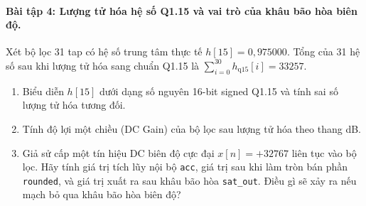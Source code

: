 \paragraph{Bài tập 4: Lượng tử hóa hệ số Q1.15 và vai trò của khâu bão hòa biên độ.}
Xét bộ lọc 31 tap có hệ số trung tâm thực tế $h[15] = 0{,}975000$. Tổng của 31 hệ số sau khi lượng tử hóa sang chuẩn Q1.15 là $\sum_{i=0}^{30} h_{\text{q15}}[i] = 33257$.
\begin{enumerate}[label=(\alph*)]
    \item Biểu diễn $h[15]$ dưới dạng số nguyên 16-bit signed Q1.15 và tính sai số lượng tử hóa tương đối.
    \item Tính độ lợi một chiều (DC Gain) của bộ lọc sau lượng tử hóa theo thang dB.
    \item Giả sử cấp một tín hiệu DC biên độ cực đại $x[n] = +32767$ liên tục vào bộ lọc. Hãy tính giá trị tích lũy nội bộ \texttt{acc}, giá trị sau khi làm tròn bán phần \texttt{rounded}, và giá trị xuất ra sau khâu bão hòa \texttt{sat\_out}. Điều gì sẽ xảy ra nếu mạch bỏ qua khâu bão hòa biên độ?
\end{enumerate}

